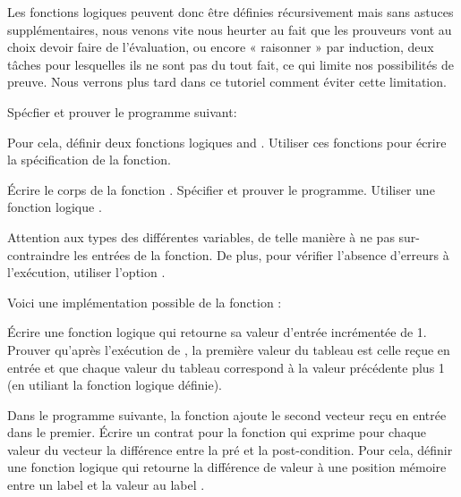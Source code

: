 Les fonctions logiques peuvent donc être définies récursivement mais sans astuces
supplémentaires, nous venons vite nous heurter au fait que les prouveurs vont au 
choix devoir faire de l'évaluation, ou encore « raisonner » par induction, deux 
tâches pour lesquelles ils ne sont pas du tout fait, ce qui limite nos 
possibilités de preuve. Nous verrons plus tard dans ce tutoriel comment éviter
cette limitation.






Spécfier et prouver le programme suivant:




Pour cela, définir deux fonctions logiques  and .
Utiliser ces fonctions pour écrire la spécification de la fonction.




Écrire le corps de la fonction . Spécifier et prouver le
programme. Utiliser une fonction logique .




Attention aux types des différentes variables, de telle manière à ne pas
sur-contraindre les entrées de la fonction. De plus, pour vérifier l'absence
d'erreurs à l'exécution, utiliser l'option .




Voici une implémentation possible de la fonction  :




Écrire une fonction logique qui retourne sa valeur d'entrée incrémentée de 1. 
Prouver qu'après l'exécution de , la première valeur du tableau
est celle reçue en entrée et que chaque valeur du tableau correspond à la valeur
précédente plus 1 (en utiliant la fonction logique définie).






Dans le programme suivante, la fonction  ajoute le second
vecteur reçu en entrée dans le premier. Écrire un contrat pour la fonction
 qui exprime pour chaque valeur du vecteur
 la différence entre la pré et la post-condition. Pour cela,
définir une fonction logique  qui retourne la différence de
valeur à une position mémoire entre un label  et la valeur au
label .



